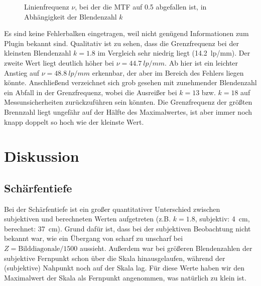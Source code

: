 \begin{figure}[H]
\centering
{}
\caption{Linienfrequenz $\nu$, bei der die MTF auf \num{0.5} abgefallen ist, in Abhängigkeit der Blendenzahl $k$}
\label{fig:mtf}
\end{figure}

Es sind keine Fehlerbalken eingetragen, weil nicht genügend Informationen zum Plugin bekannt sind. Qualitativ ist zu sehen, dass die Grenzfrequenz bei der kleinsten Blendenzahl $k=\num{1.8}$ im Vergleich sehr niedrig liegt (\SI{14.2}{lp/mm}). Der zweite Wert liegt deutlich höher bei $\nu=\SI{44.7}{lp/mm}$. Ab hier ist ein leichter Anstieg auf $\nu=\SI{48.8}{lp/mm}$ erkennbar, der aber im Bereich des Fehlers liegen könnte. Anschließend verzeichnet sich grob gesehen mit zunehmender Blendenzahl ein Abfall in der Grenzfrequenz, wobei die Ausreißer bei $k=13$ bzw. $k=18$ auf Messunsicherheiten zurückzuführen sein könnten. Die Grenzfrequenz der größten Brennzahl liegt ungefähr auf der Hälfte des Maximalwertes, ist aber immer noch knapp doppelt so hoch wie der kleinste Wert.

\section{Diskussion}

\subsection{Schärfentiefe}

Bei der Schärfentiefe ist ein großer quantitativer Unterschied zwischen subjektiven und berechneten Werten aufgetreten (z.B. $k=\num{1.8}$, subjektiv: \SI{4}{cm}, berechnet: \SI{37}{cm}). Grund dafür ist, dass bei der subjektiven Beobachtung nicht bekannt war, wie ein Übergang von scharf zu unscharf bei $Z=\text{Bilddiagonale}/1500$ aussieht. Außerdem war bei größeren Blendenzahlen der subjektive Fernpunkt schon über die Skala hinausgelaufen, während der (subjektive) Nahpunkt noch auf der Skala lag. Für diese Werte haben wir den Maximalwert der Skala als Fernpunkt angenommen, was natürlich zu klein ist.

